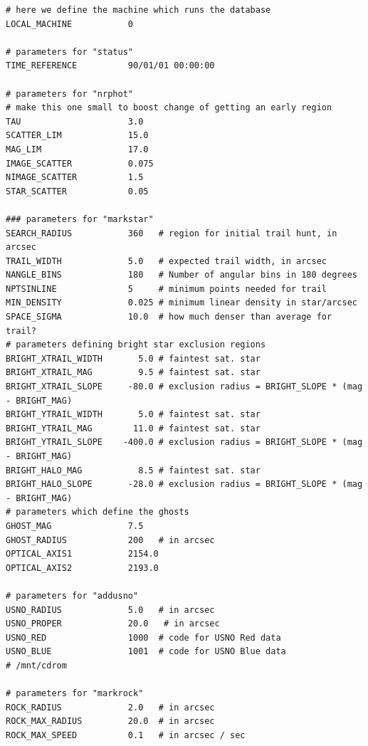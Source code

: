 \documentclass{article}
\begin{document}
{\begin{verbatim}
# here we define the machine which runs the database 
LOCAL_MACHINE           0

# parameters for "status"
TIME_REFERENCE          90/01/01 00:00:00

# parameters for "nrphot"
# make this one small to boost change of getting an early region 
TAU                     3.0             
SCATTER_LIM             15.0
MAG_LIM                 17.0
IMAGE_SCATTER           0.075
NIMAGE_SCATTER          1.5
STAR_SCATTER            0.05

### parameters for "markstar"
SEARCH_RADIUS           360   # region for initial trail hunt, in arcsec 
TRAIL_WIDTH             5.0   # expected trail width, in arcsec
NANGLE_BINS             180   # Number of angular bins in 180 degrees
NPTSINLINE              5     # minimum points needed for trail
MIN_DENSITY             0.025 # minimum linear density in star/arcsec
SPACE_SIGMA             10.0  # how much denser than average for trail?
# parameters defining bright star exclusion regions
BRIGHT_XTRAIL_WIDTH       5.0 # faintest sat. star
BRIGHT_XTRAIL_MAG         9.5 # faintest sat. star
BRIGHT_XTRAIL_SLOPE     -80.0 # exclusion radius = BRIGHT_SLOPE * (mag - BRIGHT_MAG)
BRIGHT_YTRAIL_WIDTH       5.0 # faintest sat. star
BRIGHT_YTRAIL_MAG        11.0 # faintest sat. star
BRIGHT_YTRAIL_SLOPE    -400.0 # exclusion radius = BRIGHT_SLOPE * (mag - BRIGHT_MAG)
BRIGHT_HALO_MAG           8.5 # faintest sat. star
BRIGHT_HALO_SLOPE       -28.0 # exclusion radius = BRIGHT_SLOPE * (mag - BRIGHT_MAG)
# parameters which define the ghosts
GHOST_MAG               7.5
GHOST_RADIUS            200   # in arcsec
OPTICAL_AXIS1           2154.0
OPTICAL_AXIS2           2193.0

# parameters for "addusno"
USNO_RADIUS             5.0   # in arcsec
USNO_PROPER             20.0   # in arcsec
USNO_RED                1000  # code for USNO Red data
USNO_BLUE               1001  # code for USNO Blue data
# /mnt/cdrom

# parameters for "markrock"
ROCK_RADIUS             2.0   # in arcsec
ROCK_MAX_RADIUS         20.0  # in arcsec
ROCK_MAX_SPEED          0.1   # in arcsec / sec
\end{verbatim}}
\end{document}
